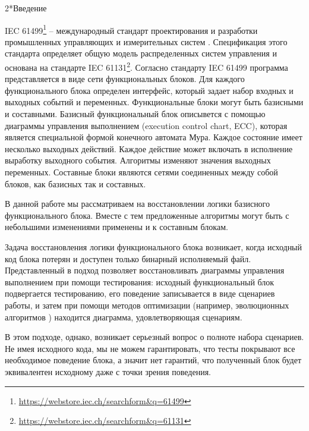 \documentclass[14pt]{extarticle}
\makeatletter
\theoremstyle{plain}
\theoremstyle{definition}
\renewcommand{\subsection}{\@startsection{subsection}{2}{0mm}%
{2\baselineskip}{\baselineskip}{\bfseries\large\itshape}}
\makeatother
\begin{document}
\pagebreak

\clearpage
\setcounter{page}{3}

\tableofcontents

\pagebreak

\subsection*{Введение}

IEC 61499\footnote{\url{https://webstore.iec.ch/searchform&q=61499}} --
международный стандарт проектирования и разработки промышленных управляющих и
измерительных систем \cite{iec}. Спецификация этого стандарта определяет общую модель
распределенных систем управления и основана на стандарте
IEC 61131\footnote{\url{https://webstore.iec.ch/searchform&q=61131}}. Согласно
стандарту IEC 61499 программа представляется в виде сети функциональных блоков.
Для каждого функционального блока определен интерфейс, который задает набор
входных и выходных событий и переменных. Функциональные блоки могут быть
базисными и составными. Базисный функциональный блок описывется с помощью
диаграммы управления выполнением (execution control chart, ECC), которая является специальной формой конечного
автомата Мура. Каждое состояние имеет несколько выходных действий. Каждое
действие может включать в исполнение выработку выходного события. Алгоритмы
изменяют значения выходных переменных. Составные блоки являются сетями соединенных
между собой блоков, как базисных так и составных.

В данной работе мы рассматриваем на восстановлении логики базисного
функционального блока. Вместе с тем предложенные алгоритмы могут быть с небольшими изменениями
применены и к составным блокам.

Задача восстановления логики функционального блока возникает, когда исходный код
блока потерян и доступен только бинарный исполняемый файл. Представленный
в \cite{rec} подход позволяет восстановливать диаграммы управления выполнением при помощи
тестирования: исходный функциональный блок подвергается тестированию, его
поведение записывается в виде сценариев работы, и затем при помощи
методов оптимизации (например, эволюционных алгоритмов \cite{ea}) находится диаграмма, удовлетворяющая сценариям.

В этом подходе, однако, возникает серьезный вопрос о полноте набора сценариев.
Не имея исходного кода, мы не можем гарантировать, что тесты покрывают все
необходимое поведение блока, а значит нет гарантий, что полученный блок будет
эквивалентен исходному даже с точки зрения поведения.
\end{document}
